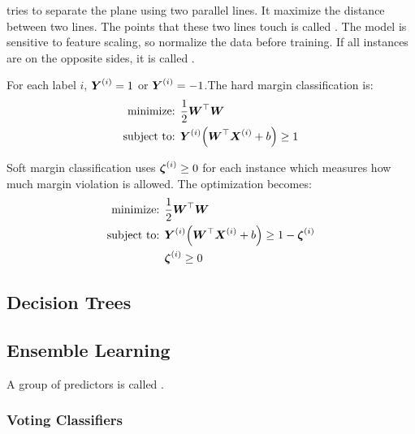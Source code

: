  tries to separate the plane using two parallel lines. It maximize the distance between two lines. The points that these two lines touch is called . The model is sensitive to feature scaling, so normalize the data before training. If all instances are on the opposite sides, it is called .


For each label $i$, $\boldsymbol{Y}^{(i)} =1$ or $\boldsymbol{Y}^{(i)} =-1$.The hard margin classification is:
\begin{equation}
    \begin{aligned}
        \text{minimize: } & \frac{1}{2} \columnvector{W}^\top \columnvector{W} \\
        \text{subject to: } & \subscription{Y}{i} \mleft( \columnvector{W}^\top \subscription{X}{i} + b \mright) \geq 1
    \end{aligned}
\end{equation}

Soft margin classification uses  $\boldsymbol{\zeta}^{(i)} \geq 0$ for each instance which measures how much margin violation is allowed. The optimization becomes:
\begin{equation}
    \begin{aligned}
        \text{minimize: } & \frac{1}{2} \columnvector{W}^\top \columnvector{W} \\
        \text{subject to: } & \subscription{Y}{i} \mleft( \columnvector{W}^\top \subscription{X}{i} + b \mright) \geq 1 - \subscription{\zeta}{i} \\
        & \subscription{\zeta}{i} \geq 0
    \end{aligned}
\end{equation}


\subsection{Decision Trees}

\subsection{Ensemble Learning}

A group of predictors is called .

\subsubsection{Voting Classifiers}


